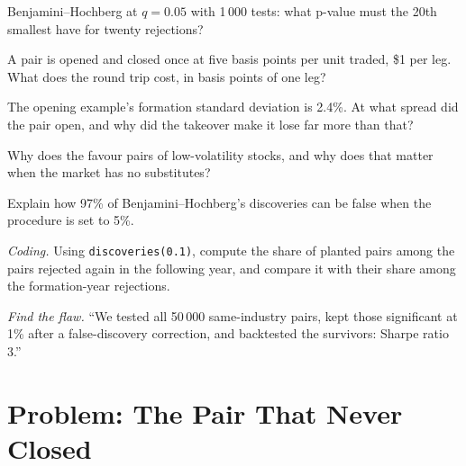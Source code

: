 \begin{exercise}[$\star$]\label{exo:s1:pairs-and-baskets:2}
Benjamini--Hochberg at $q = 0.05$ with 1\,000 tests: what p-value must the 20th smallest have for twenty rejections?
\end{exercise}

\begin{exercise}[$\star$]\label{exo:s1:pairs-and-baskets:3}
A pair is opened and closed once at five basis points per unit traded, \$1 per leg. What does the round trip cost, in basis points of one leg?
\end{exercise}

\begin{exercise}[$\star\star$]\label{exo:s1:pairs-and-baskets:4}
The opening example's formation standard deviation is 2.4\%. At what spread did the pair open, and why did the takeover make it lose far more than that?
\end{exercise}

\begin{exercise}[$\star\star$]\label{exo:s1:pairs-and-baskets:5}
Why does the  favour pairs of low-volatility stocks, and why does that matter when the market has no substitutes?
\end{exercise}

\begin{exercise}[$\star\star$]\label{exo:s1:pairs-and-baskets:6}
Explain how 97\% of Benjamini--Hochberg's discoveries can be false when the procedure is set to 5\%.
\end{exercise}

\begin{exercise}[$\star\star\star$]\label{exo:s1:pairs-and-baskets:7}
\emph{Coding.} Using \texttt{discoveries(0.1)}, compute the share of planted pairs among the pairs rejected again in the following year, and compare it with
their share among the formation-year rejections.
\end{exercise}

\begin{exercise}[$\star\star\star$]\label{exo:s1:pairs-and-baskets:8}
\emph{Find the flaw.} ``We tested all 50\,000 same-industry pairs, kept those significant at 1\% after a false-discovery correction, and backtested the
survivors: Sharpe ratio 3.''
\end{exercise}

\section{Problem: The Pair That Never Closed}


